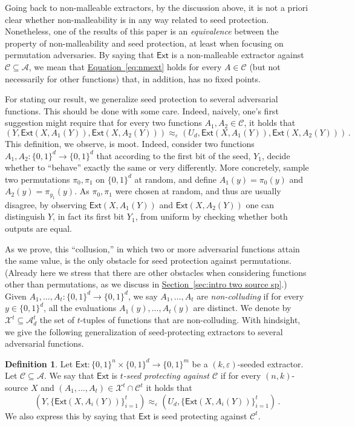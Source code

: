 \documentclass[11pt]{article}
\numberwithin{equation}{section}
\theoremstyle{definition}
\newtheorem{definition}[theorem]{Definition}
\theoremstyle{plain}
\newcommand{\expref}[2]{\hyperref[#2]{#1~\ref{#2}}}
\newcommand{\expeqref}[2]{\hyperref[#2]{#1~\eqref{#2}}}
\newcommand{\ccc}{\mathcal{C}}
\newcommand{\ext}{\mathsf{Ext}}
\newcommand{\adv}{A}
\newcommand{\advfam}{\mathcal{A}}
\newcommand{\eps}{\varepsilon}
\newcommand{\nc}{\mathcal{X}}
\begin{document}
Going back to non-malleable extractors, by the discussion above, it is not a priori clear whether non-malleability is in any way related to seed protection. Nonetheless, one of the results of %
this paper %
is an \emph{equivalence} between the property of non-malleability and seed protection, at least when focusing on permutation adversaries. By saying that $\ext$ is a non-malleable extractor against $\ccc \subseteq \advfam$, we mean that \expeqref{Equation}{eq:nmext} holds for every $\adv \in \ccc$ (but not necessarily for other functions) that, in addition, has no fixed points. 

For stating our result, we generalize seed protection to several adversarial functions. This should be done with some care. Indeed, naively, one's first suggestion might require that for every two functions $\adv_1,\adv_2 \in \ccc$, it holds that
\[
\left(Y, \ext(X,\adv_1(Y)),\ext(X,\adv_2(Y))\right) \approx_\eps \left(U_d, \ext(X,\adv_1(Y)),\ext(X,\adv_2(Y))\right)\,.
\]
This definition, we observe, is moot. Indeed, consider two functions $A_1, A_2 \colon \{0,1\}^d \to \{0,1\}^d$ that according to the first bit of the seed, $Y_1$, decide whether to ``behave'' exactly the same or very differently. More concretely, sample two permutations $\pi_0,\pi_1$ on $\{0,1\}^d$ at random, and define $A_1(y) = \pi_0(y)$ and $A_2(y) = \pi_{y_1}(y)$.
As $\pi_0,\pi_1$ were chosen at random, and thus are usually disagree, by observing $\ext(X,\adv_1(Y))$ and $\ext(X,\adv_2(Y))$ one can distinguish $Y$, in fact its first bit $Y_1$, from uniform by checking whether both outputs are equal.

As we prove, this %
``collusion,''  %
%
in which two or more  %
adversarial functions attain the same value, is the only obstacle for seed protection against permutations.  %
%
(Already  %
here we stress that there are other obstacles when considering functions other than permutations, as we discuss
in \expref{Section}{sec:intro two source sp}.) %
%
Given $\adv_1,\ldots,\adv_t \colon \{0,1\}^d \rightarrow \{0,1\}^d$, we say $\adv_1,\ldots,\adv_t$ are
\emph{non-colluding} if for every $y \in \{0,1\}^d$, all the evaluations $\adv_1(y),\ldots,\adv_{t}(y)$ are distinct. We denote by $\nc^t \subseteq \advfam^t_d$ the set of $t$-tuples of functions that are non-colluding.
%
%
%
%
With hindsight, we give the following generalization of seed-protecting extractors to several adversarial functions.

\begin{definition}
Let $\ext \colon \{0,1\}^n \times \{0,1\}^d \to \{0,1\}^m$ be a $(k,\eps)$-seeded extractor. Let $\ccc \subseteq \advfam$. We say that $\ext$ is \emph{$t$-seed protecting against $\ccc$}
if for every $(n,k)$-source $X$ and $(\adv_1,\ldots,\adv_t) \in \nc^t \cap \ccc^t$ it holds that
\[
\left(Y, \{\ext(X,\adv_i(Y))\}_{i=1}^{t}\right) \approx_\eps \left(U_d, \{\ext(X,\adv_i(Y))\}_{i=1}^{t}\right)\,.
\]
We also express this by saying that $\ext$ is seed protecting against $\ccc^t$.
\end{definition}
\end{document}
